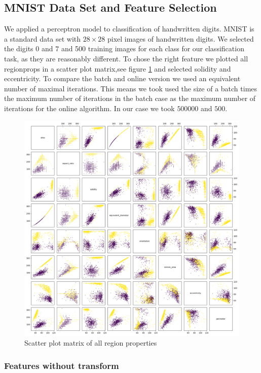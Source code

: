 \subsection{MNIST Data Set and Feature Selection}

We applied a perceptron model to classification of handwritten digits. MNIST is a standard data set with $28\times28$ pixel images of handwritten digits.
We selected the digits $0$ and $7$ and 500 training images for each class for our classification task, as they are reasonably different. To chose the right feature we plotted all regionprops in a scatter plot matrix,see figure \ref{perceptron:features} and selected solidity and eccentricity. To compare the batch and online version we used an equivalent number of maximal iterations. This means we took used the size of a batch times the maximum number of iterations in the batch case as the maximum number of iterations for the online algorithm. In our case we took $500000$ and $500$.

\begin{figure}
\includegraphics[width=\textwidth]{figures/scatter_matrix}
\caption{Scatter plot matrix of all region properties}
\label{perceptron:features}
\end{figure}

\subsubsection{Features without transform}

